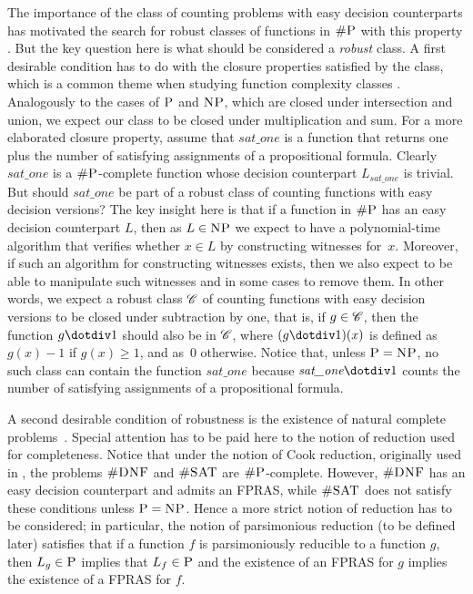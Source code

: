 The importance of the class of counting problems with easy decision counterparts has motivated the search for robust classes of functions in $\text{\sc \#P}$ with this property \cite{PagourtzisZ06}. But the key question here is what should be considered a {\em robust} class. 
A first desirable condition has to do with the closure properties satisfied by the class, which is a common theme when studying function complexity classes \cite{OH93,FH08}. Analogously to the cases of $\text{\sc P}$ and $\text{\sc NP}$, which are closed under intersection and union, we expect our class to be closed under multiplication and sum. For a more elaborated closure property, assume that $\textit{sat\_one}$ is a function that returns one plus the number of satisfying assignments of a propositional formula. Clearly $\textit{sat\_one}$ is a $\text{\sc \#P}$-complete function whose decision counterpart $L_{\textit{sat\_one}}$ is trivial. But should $\textit{sat\_one}$ be part of a robust class of counting functions with easy decision versions? The key insight here is that if a function in $\text{\sc \#P}$ has an easy decision counterpart $L$, then as $L \in \text{\sc NP}$ we expect  to have a polynomial-time algorithm that verifies whether $x \in L$ by constructing witnesses for~$x$. 
Moreover, if such an algorithm for constructing witnesses exists, then we also expect to be able to manipulate such witnesses and in some cases to remove them. In other words, we expect a robust class $\mathscr{C}$ of counting functions with easy decision versions to be closed under subtraction by one, that is, if $g \in \mathscr{C}$, then the function $g \dotdiv 1$ should also be in $\mathscr{C}$, where $(g \dotdiv 1)(x)$ is defined as $g(x) - 1$ if $g(x) \geq 1$, and as~$0$ otherwise. Notice that, unless $\text{\sc P} = \text{\sc NP}$, no such class can contain the function $\textit{sat\_one}$ because $\textit{sat\_one} \dotdiv 1$ counts the number of satisfying assignments of a propositional formula.

A second desirable condition of robustness is the existence of natural complete problems~\cite{P94}. Special attention has to be paid here to the notion of reduction used for completeness. Notice that under the notion of Cook reduction, originally used in \cite{Valiant79}, the problems $\textsc{\#DNF}$ and $\textsc{\#SAT}$ are $\text{\sc \#P}$-complete. However, $\textsc{\#DNF}$ has an easy decision counterpart and admits an FPRAS, while $\textsc{\#SAT}$ does not satisfy these conditions unless $\text{\sc P} = \text{\sc NP}$. Hence a more strict notion of reduction has to be considered; in particular, the notion of parsimonious reduction (to be defined later) satisfies that if a function $f$ is parsimoniously reducible to a function $g$, then $L_g \in \text{\sc P}$ implies that $L_f \in \text{\sc P}$ and the existence of an FPRAS for $g$ implies the existence of a FPRAS for $f$. 


